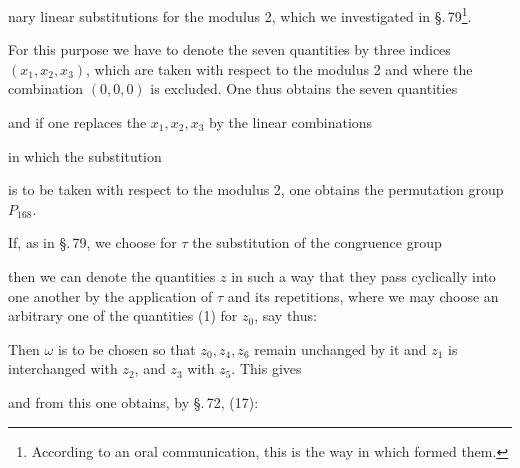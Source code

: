 nary linear substitutions for the modulus 2, which we investigated in \S.\,79\footnote{According to an oral communication, this is the way in which  formed them.}.

For this purpose we have to denote the seven quantities by three indices $(x_1, x_2, x_3)$, which are taken with respect to the modulus 2 and where the combination $(0, 0, 0)$ is excluded. One thus obtains the seven quantities


and if one replaces the $x_1, x_2, x_3$ by the linear combinations


in which the substitution


is to be taken with respect to the modulus 2, one obtains the permutation group $P_{168}$.

If, as in \S.\,79, we choose for $\tau$ the substitution of the congruence group


then we can denote the quantities $z$ in such a way that they pass cyclically into one another by the application of $\tau$ and its repetitions, where we may choose an arbitrary one of the quantities (1) for $z_0$, say thus:


Then $\omega$ is to be chosen so that $z_0, z_4, z_6$ remain unchanged by it and $z_1$ is interchanged with $z_2$, and $z_3$ with $z_5$. This gives


and from this one obtains, by \S.\,72, (17):

